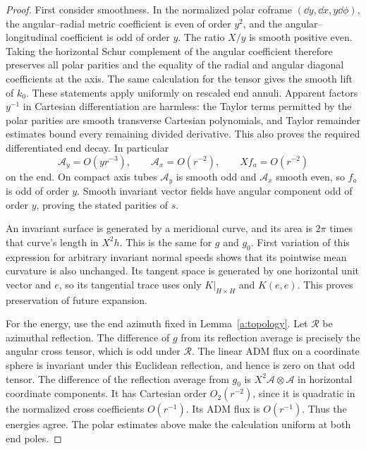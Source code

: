 \begin{proof}
First consider smoothness.  In the normalized polar coframe
$(\dd y,\dd x,y\dd\phi)$, the angular--radial metric coefficient
is even of order $y^2$, and the angular--longitudinal coefficient
is odd of order $y$.  The ratio $X/y$ is smooth positive even.
Taking the horizontal Schur complement of the angular coefficient
therefore preserves all polar parities and the equality of the
radial and angular diagonal coefficients at the axis.  The same
calculation for the tensor gives the smooth lift of $k_0$.
These statements apply uniformly on rescaled end annuli.  Apparent
factors $y^{-1}$ in Cartesian differentiation are harmless: the
Taylor terms permitted by the polar parities are smooth transverse
Cartesian polynomials, and Taylor remainder estimates bound every
remaining divided derivative.  This also proves the required
differentiated end decay.  In particular
\[
 \mathcal A_y=O(yr^{-3}),\qquad
 \mathcal A_x=O(r^{-2}),\qquad Xf_a=O(r^{-2})
\]
on the end.  On compact axis tubes $\mathcal A_y$ is smooth odd
and $\mathcal A_x$ smooth even, so $f_a$ is odd of order $y$.
Smooth invariant vector fields have angular component odd of
order $y$, proving the stated parities of $s$.

An invariant surface is generated by a meridional curve, and its
area is $2\pi$ times that curve's length in $X^2h$.  This is the
same for $g$ and $g_0$.  First variation of this expression for
arbitrary invariant normal speeds shows that its pointwise mean
curvature is also unchanged.  Its tangent space is generated by
one horizontal unit vector and $e$, so its tangential trace uses
only $K|_{H\times H}$ and $K(e,e)$.  This proves preservation of
future expansion.

For the energy, use the end azimuth fixed in
Lemma~\ref{a:topology}.  Let $\mathcal R$ be azimuthal reflection.
The difference of $g$ from its reflection average is precisely
the angular cross tensor, which is odd under $\mathcal R$.
The linear ADM flux on a coordinate sphere is invariant under
this Euclidean reflection, and hence is zero on that odd tensor.
The difference of the reflection average from $g_0$ is
$X^2\mathcal A\otimes\mathcal A$ in horizontal coordinate
components.  It has Cartesian order $O_2(r^{-2})$, since it is
quadratic in the normalized cross coefficients $O(r^{-1})$.
Its ADM flux is $O(r^{-1})$.  Thus the energies agree.  The polar
estimates above make the calculation uniform at both end poles.


\end{proof}
